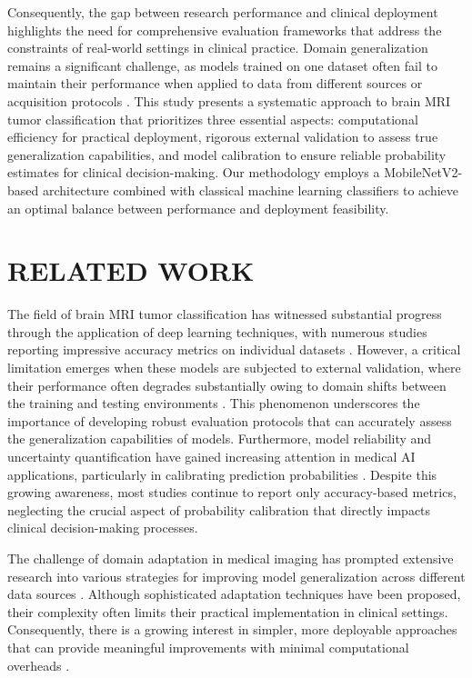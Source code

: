 \documentclass[conference]{IEEEtran}
\begin{document}
Consequently, the gap between research performance and clinical deployment highlights the need for comprehensive evaluation frameworks that address the constraints of real-world settings in clinical practice. Domain generalization remains a significant challenge, as models trained on one dataset often fail to maintain their performance when applied to data from different sources or acquisition protocols \cite{kim2019, zech2018}. This study presents a systematic approach to brain MRI tumor classification that prioritizes three essential aspects: computational efficiency for practical deployment, rigorous external validation to assess true generalization capabilities, and model calibration to ensure reliable probability estimates for clinical decision-making. Our methodology employs a MobileNetV2-based architecture combined with classical machine learning classifiers to achieve an optimal balance between performance and deployment feasibility.

\section{RELATED WORK}

The field of brain MRI tumor classification has witnessed substantial progress through the application of deep learning techniques, with numerous studies reporting impressive accuracy metrics on individual datasets \cite{litjens2017}. However, a critical limitation emerges when these models are subjected to external validation, where their performance often degrades substantially owing to domain shifts between the training and testing environments \cite{kim2019}. This phenomenon underscores the importance of developing robust evaluation protocols that can accurately assess the generalization capabilities of models. Furthermore, model reliability and uncertainty quantification have gained increasing attention in medical AI applications, particularly in calibrating prediction probabilities \cite{guo2017}. Despite this growing awareness, most studies continue to report only accuracy-based metrics, neglecting the crucial aspect of probability calibration that directly impacts clinical decision-making processes.

The challenge of domain adaptation in medical imaging has prompted extensive research into various strategies for improving model generalization across different data sources \cite{wang2019}. Although sophisticated adaptation techniques have been proposed, their complexity often limits their practical implementation in clinical settings. Consequently, there is a growing interest in simpler, more deployable approaches that can provide meaningful improvements with minimal computational overheads \cite{lu2020}.
\end{document}
